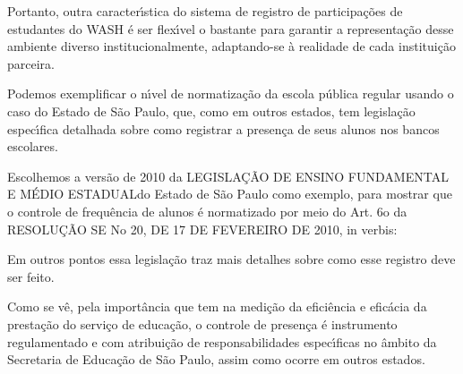 \documentclass[
12pt,		%
openright,	%
twoside,  %
a4paper,			%
chapter=TITLE,		%
english,			%
french,				%
spanish,			%
brazil				%
]{USPSC-classe/USPSC_RedarTex}
\begin{document}
Portanto, outra caracter\'{\i}stica do sistema de registro de participa\c{c}\~oes de estudantes do WASH \'e ser flex\'{\i}vel o bastante para garantir a representa\c{c}\~ao desse ambiente diverso institucionalmente, adaptando-se \`a realidade de cada institui\c{c}\~ao parceira.








Podemos exemplificar o n\'{\i}vel de normatiza\c{c}\~ao da escola p\'ublica regular usando o caso do Estado de S\~ao Paulo, que, como em outros estados, tem legisla\c{c}\~ao espec\'{\i}fica detalhada sobre como registrar a presen\c{c}a de seus alunos nos bancos escolares.








Escolhemos a vers\~ao de 2010 da \textquotedbl LEGISLA\c{C}\~AO DE ENSINO FUNDAMENTAL E M\'EDIO ESTADUAL\textquotedbl  do Estado de S\~ao Paulo como exemplo, para mostrar que o controle de frequ\^encia de alunos \'e normatizado por meio do Art. 6o da RESOLU\c{C}\~AO SE No 20, DE 17 DE FEVEREIRO DE 2010, in verbis:









\noindent\begin{center}\mbox{\centering{}}\end{center}


Em outros pontos essa legisla\c{c}\~ao traz mais detalhes sobre como esse registro deve ser feito.








Como se v\^e, pela import\^ancia que tem na medi\c{c}\~ao da efici\^encia e efic\'acia da presta\c{c}\~ao do servi\c{c}o de educa\c{c}\~ao, o controle de presen\c{c}a \'e instrumento regulamentado e com atribui\c{c}\~ao de responsabilidades espec\'{\i}ficas no \^ambito da Secretaria de Educa\c{c}\~ao de S\~ao Paulo, assim como ocorre em outros estados.
\end{document}
